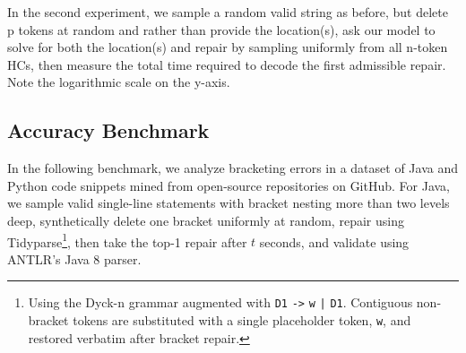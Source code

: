 \documentclass[sigplan,review,anonymous,acmsmall]{acmart}\settopmatter{printfolios=false,printccs=false,printacmref=false}
\begin{document}
\noindent In the second experiment, we sample a random valid string as before, but delete p tokens at random and rather than provide the location(s), ask our model to solve for both the location(s) and repair by sampling uniformly from all n-token HCs, then measure the total time required to decode the first admissible repair. Note the logarithmic scale on the y-axis.

\subsection{Accuracy Benchmark}

In the following benchmark, we analyze bracketing errors in a dataset of Java and Python code snippets mined from open-source repositories on GitHub. For Java, we sample valid single-line statements with bracket nesting more than two levels deep, synthetically delete one bracket uniformly at random, repair using Tidyparse\footnote{Using the Dyck-n grammar augmented with \texttt{D1} {\color{blue}\texttt{->}} \texttt{w} {\color{blue}\texttt{|}} \texttt{D1}. Contiguous non-bracket tokens are substituted with a single placeholder token, \texttt{w}, and restored verbatim after bracket repair.}, then take the top-1 repair after $t$ seconds, and validate using ANTLR's Java 8 parser.
\end{document}
